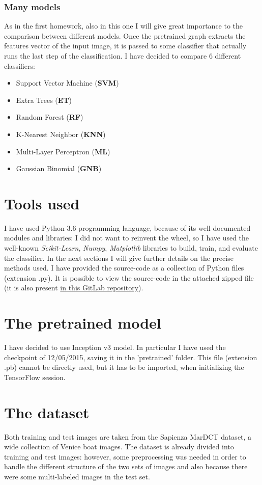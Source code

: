 \documentclass[12pt]{article}
\begin{document}
\subsubsection{Many models}
\label{sec:models}
As in the first homework, also in this one I will give great importance to the comparison between different models. Once the pretrained graph extracts the features vector of the input image, it is passed to some classifier that actually runs the last step of the classification. I have decided to compare 6 different classifiers:
\begin{itemize}
	\item Support Vector Machine (\textbf{SVM})
	\item Extra Trees (\textbf{ET})
	\item Random Forest (\textbf{RF})
	\item K-Nearest Neighbor (\textbf{KNN})
	\item Multi-Layer Perceptron (\textbf{ML})
	\item Gaussian Binomial (\textbf{GNB})
\end{itemize}

\section{Tools used}
I have used Python 3.6 programming language, because of its well-documented modules and libraries: I did not want to reinvent the wheel, so I have used the well-known \textit{Scikit-Learn}, \textit{Numpy}, \textit{Matplotlib} libraries to build, train, and evaluate the classifier. In the next sections I will give further details on the precise methods used.
I have provided the source-code as a collection of Python files (extension .py). It is possible to view the source-code in the attached zipped file (it is also present \href{https://www.gitlab.com/lrusso96/machine-learning}{in this GitLab repository}).

\section{The pretrained model}
I have decided to use Inception v3 model. In particular I have used the checkpoint of 12/05/2015, saving it in the 'pretrained' folder. This file (extension .pb) cannot be directly used, but it has to be imported, when initializing the TensorFlow session.

\section{The dataset}
\label{sec:dataset}
Both training and test images are taken from the Sapienza MarDCT dataset, a wide collection of Venice boat images. The dataset is already divided into training and test images: however, some preprocessing was needed in order to handle the different structure of the two sets of images and also because there were some multi-labeled images in the test set.
\end{document}
